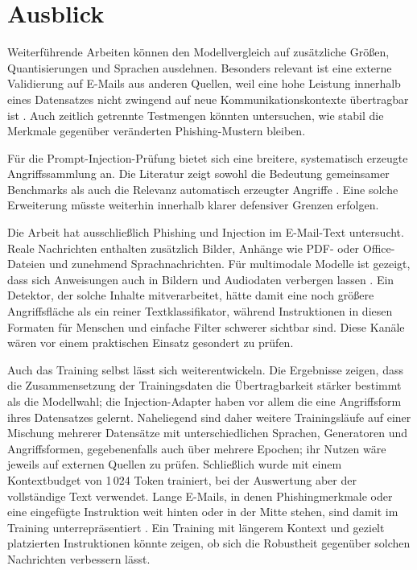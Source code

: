 \documentclass[12pt,twoside=false,a4paper,parskip]{scrbook}
\begin{document}
\section{Ausblick}\label{sec:ausblick}

Weiterführende Arbeiten können den Modellvergleich auf zusätzliche Größen, Quantisierungen und Sprachen ausdehnen. Besonders relevant ist eine externe Validierung auf E-Mails aus anderen Quellen, weil eine hohe Leistung innerhalb eines Datensatzes nicht zwingend auf neue Kommunikationskontexte übertragbar ist \cite{pajola2025ephishgen}. Auch zeitlich getrennte Testmengen könnten untersuchen, wie stabil die Merkmale gegenüber veränderten Phishing-Mustern bleiben.

Für die Prompt-Injection-Prüfung bietet sich eine breitere, systematisch erzeugte Angriffssammlung an. Die Literatur zeigt sowohl die Bedeutung gemeinsamer Benchmarks als auch die Relevanz automatisch erzeugter Angriffe \cite{liu2024formalizing,duarte2026systematic}. Eine solche Erweiterung müsste weiterhin innerhalb klarer defensiver Grenzen erfolgen.

Die Arbeit hat ausschließlich Phishing und Injection im E-Mail-Text untersucht. Reale Nachrichten enthalten zusätzlich Bilder, Anhänge wie PDF- oder Office-Dateien und zunehmend Sprachnachrichten. Für multimodale Modelle ist gezeigt, dass sich Anweisungen auch in Bildern und Audiodaten verbergen lassen \cite{bagdasaryan2023abusing}. Ein Detektor, der solche Inhalte mitverarbeitet, hätte damit eine noch größere Angriffsfläche als ein reiner Textklassifikator, während Instruktionen in diesen Formaten für Menschen und einfache Filter schwerer sichtbar sind. Diese Kanäle wären vor einem praktischen Einsatz gesondert zu prüfen.

Auch das Training selbst lässt sich weiterentwickeln. Die Ergebnisse zeigen, dass die Zusammensetzung der Trainingsdaten die Übertragbarkeit stärker bestimmt als die Modellwahl; die Injection-Adapter haben vor allem die eine Angriffsform ihres Datensatzes gelernt. Naheliegend sind daher weitere Trainingsläufe auf einer Mischung mehrerer Datensätze mit unterschiedlichen Sprachen, Generatoren und Angriffsformen, gegebenenfalls auch über mehrere Epochen; ihr Nutzen wäre jeweils auf externen Quellen zu prüfen. Schließlich wurde mit einem Kontextbudget von 1\,024 Token trainiert, bei der Auswertung aber der vollständige Text verwendet. Lange E-Mails, in denen Phishingmerkmale oder eine eingefügte Instruktion weit hinten oder in der Mitte stehen, sind damit im Training unterrepräsentiert \cite{liu2024lost}. Ein Training mit längerem Kontext und gezielt platzierten Instruktionen könnte zeigen, ob sich die Robustheit gegenüber solchen Nachrichten verbessern lässt.
\end{document}
